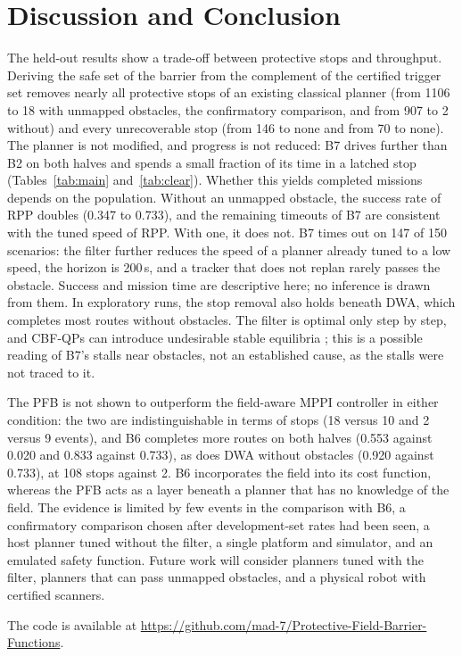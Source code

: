 \documentclass[conference]{IEEEtran}
\begin{document}
\section{Discussion and Conclusion}
The held-out results show a trade-off between protective stops and throughput. Deriving the safe set
of the barrier from the complement of the certified trigger set removes nearly all protective stops of an existing
classical planner (from 1106 to 18 with unmapped obstacles, the confirmatory comparison, and from 907 to 2 without)
and every unrecoverable stop (from 146 to none and from 70 to none). The planner is not modified, and progress is
not reduced: B7 drives further than B2 on both halves and spends a small fraction of its time in a latched stop
(Tables~\ref{tab:main} and~\ref{tab:clear}). Whether this yields completed missions depends on the population. Without an unmapped obstacle, the success
rate of RPP doubles (0.347 to 0.733), and the remaining timeouts of B7 are consistent with the tuned speed of RPP. With one,
it does not. B7 times out on 147 of 150 scenarios: the filter further reduces the speed of a planner already
tuned to a low speed, the horizon is 200\,s, and a tracker that does not replan rarely passes the obstacle. Success and mission time are descriptive here; no inference is drawn from them. In exploratory runs, the stop
removal also holds beneath DWA, which completes most routes without obstacles. The filter is optimal only
step by step, and CBF-QPs can introduce undesirable stable equilibria \cite{reis2020undesirable,garg2024advances};
this is a possible reading of B7's stalls near obstacles, not an established cause, as the stalls were not
traced to it.

The PFB is not shown to outperform the field-aware MPPI controller in either condition: the two are
indistinguishable in terms of stops (18 versus 10 and 2 versus 9 events), and B6 completes more routes on both
halves (0.553 against 0.020 and 0.833 against 0.733), as does DWA without obstacles (0.920 against 0.733), at 108
stops against 2. B6 incorporates the field into its cost function, whereas the PFB acts as a layer beneath a
planner that has no knowledge of the field. The evidence is limited by few events in the comparison with B6, a
confirmatory comparison chosen after development-set rates had been seen, a host planner tuned without the filter,
a single platform and simulator, and an emulated safety function. Future work will consider planners tuned with
the filter, planners that can pass unmapped obstacles, and a physical robot with certified scanners.

The code is available at \url{https://github.com/mad-7/Protective-Field-Barrier-Functions}.



\end{document}
